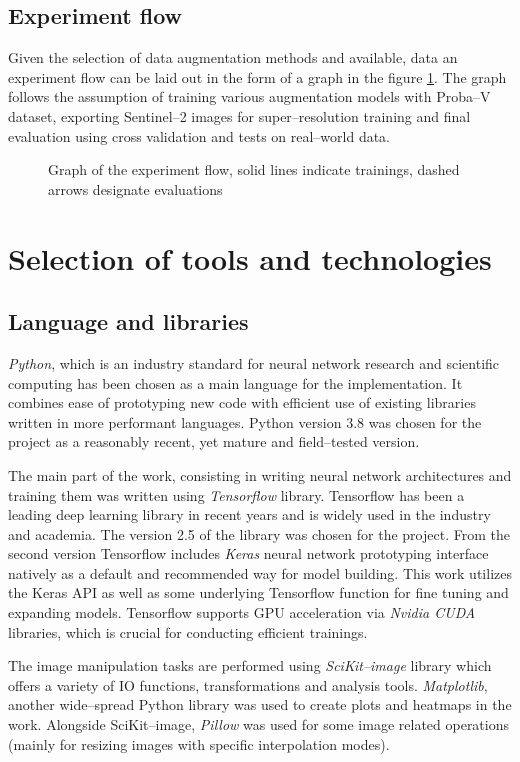 \subsection{Experiment flow}
Given the selection of data augmentation methods and available, data an experiment flow can be laid out in the form of a graph in the figure \ref{fig:experiment-flow}.
The graph follows the assumption of training various augmentation models with Proba--V dataset, exporting Sentinel--2 images for super--resolution training and final evaluation using cross validation and tests on real--world data.
\begin{figure}
	\centering
	
	\caption{Graph of the experiment flow, solid lines indicate trainings, dashed arrows designate evaluations}
	\label{fig:experiment-flow}
\end{figure}

\section{Selection of tools and technologies}
\subsection{Language and libraries}
\textit{Python}, which is an industry standard for neural network research and scientific computing has been chosen as a main language for the implementation.
It combines ease of prototyping new code with efficient use of existing libraries written in more performant languages.
Python version 3.8 was chosen for the project as a reasonably recent, yet mature and field--tested version.

The main part of the work, consisting in writing neural network architectures and training them was written using \textit{Tensorflow} library.
Tensorflow has been a leading deep learning library in recent years and is widely used in the industry and academia.
The version 2.5 of the library was chosen for the project.
From the second version Tensorflow includes \textit{Keras} neural network prototyping interface natively as a default and recommended way for model building.
This work utilizes the Keras API as well as some underlying Tensorflow function for fine tuning and expanding models.
Tensorflow supports GPU acceleration via \textit{Nvidia CUDA} libraries, which is crucial for conducting efficient trainings.

The image manipulation tasks are performed using \textit{SciKit--image} library which offers a variety of IO functions, transformations and analysis tools.
\textit{Matplotlib}, another wide--spread Python library was used to create plots and heatmaps in the work.
Alongside SciKit--image, \textit{Pillow} was used for some image related operations (mainly for resizing images with specific interpolation modes).

